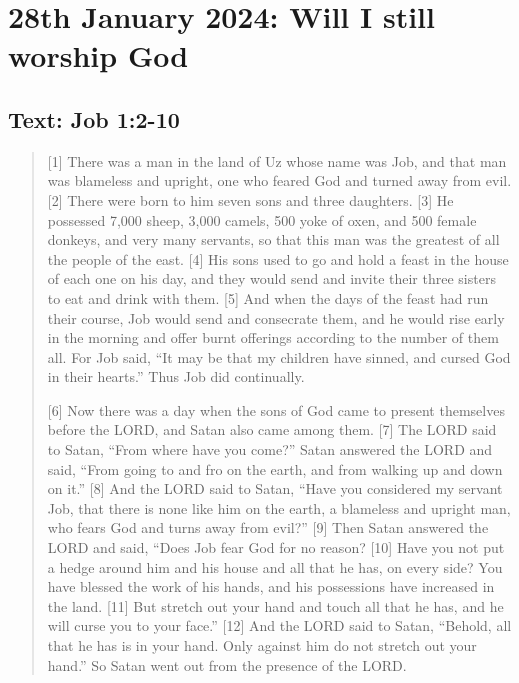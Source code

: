 \setcounter{figure}{0}

\section{28th January 2024: Will I still worship God}
\subsection*{Text: Job 1:2-10}
  \begin{quote}
    [1] There was a man in the land of Uz whose name was Job, and that man was blameless and upright, one who feared God and turned away from evil. [2] There were born to him seven sons and three daughters. [3] He possessed 7,000 sheep, 3,000 camels, 500 yoke of oxen, and 500 female donkeys, and very many servants, so that this man was the greatest of all the people of the east. [4] His sons used to go and hold a feast in the house of each one on his day, and they would send and invite their three sisters to eat and drink with them. [5] And when the days of the feast had run their course, Job would send and consecrate them, and he would rise early in the morning and offer burnt offerings according to the number of them all. For Job said, “It may be that my children have sinned, and cursed God in their hearts.” Thus Job did continually.

    [6] Now there was a day when the sons of God came to present themselves before the LORD, and Satan also came among them. [7] The LORD said to Satan, “From where have you come?” Satan answered the LORD and said, “From going to and fro on the earth, and from walking up and down on it.” [8] And the LORD said to Satan, “Have you considered my servant Job, that there is none like him on the earth, a blameless and upright man, who fears God and turns away from evil?” [9] Then Satan answered the LORD and said, “Does Job fear God for no reason? [10] Have you not put a hedge around him and his house and all that he has, on every side? You have blessed the work of his hands, and his possessions have increased in the land. [11] But stretch out your hand and touch all that he has, and he will curse you to your face.” [12] And the LORD said to Satan, “Behold, all that he has is in your hand. Only against him do not stretch out your hand.” So Satan went out from the presence of the LORD.


\end{quote}
